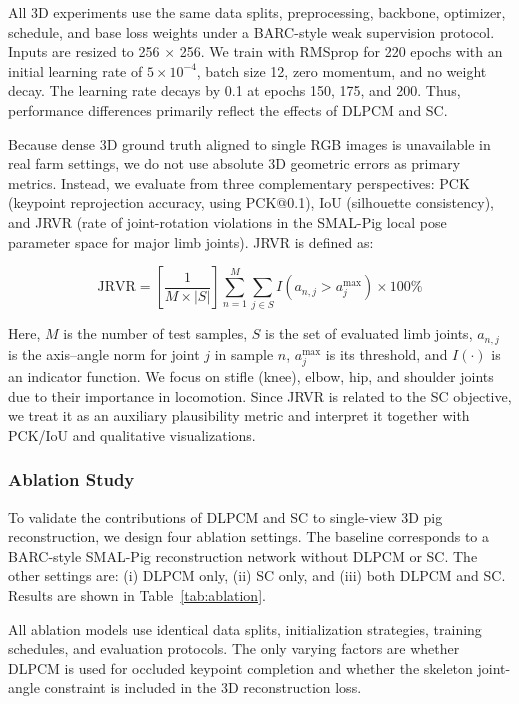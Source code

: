 \documentclass[computers,article,submit,pdftex,moreauthors]{Definitions/mdpi}
\begin{document}
All 3D experiments use the same data splits, preprocessing, backbone, optimizer, schedule, and base loss weights under a BARC-style weak supervision protocol. Inputs are resized to 256 $\times$ 256. We train with RMSprop for 220 epochs with an initial learning rate of $5 \times 10^{-4}$, batch size 12, zero momentum, and no weight decay. The learning rate decays by 0.1 at epochs 150, 175, and 200. Thus, performance differences primarily reflect the effects of DLPCM and SC.

Because dense 3D ground truth aligned to single RGB images is unavailable in real farm settings, we do not use absolute 3D geometric errors as primary metrics. Instead, we evaluate from three complementary perspectives: PCK (keypoint reprojection accuracy, using PCK@0.1), IoU (silhouette consistency), and JRVR (rate of joint-rotation violations in the SMAL-Pig local pose parameter space for major limb joints). JRVR is defined as:

\begin{equation}
\text{JRVR} = \left[\frac{1}{M \times |S|}\right] \sum_{n=1}^{M} \sum_{j \in S} I(a_{n,j} > a_j^{\max}) \times 100\%
\end{equation}

Here, $M$ is the number of test samples, $S$ is the set of evaluated limb joints, $a_{n,j}$ is the axis--angle norm for joint $j$ in sample $n$, $a_j^{\max}$ is its threshold, and $I(\cdot)$ is an indicator function. We focus on stifle (knee), elbow, hip, and shoulder joints due to their importance in locomotion. Since JRVR is related to the SC objective, we treat it as an auxiliary plausibility metric and interpret it together with PCK/IoU and qualitative visualizations.

\subsubsection{Ablation Study}\label{sec:ablation}

To validate the contributions of DLPCM and SC to single-view 3D pig reconstruction, we design four ablation settings. The baseline corresponds to a BARC-style SMAL-Pig reconstruction network without DLPCM or SC. The other settings are: (i) DLPCM only, (ii) SC only, and (iii) both DLPCM and SC. Results are shown in Table~\ref{tab:ablation}.

All ablation models use identical data splits, initialization strategies, training schedules, and evaluation protocols. The only varying factors are whether DLPCM is used for occluded keypoint completion and whether the skeleton joint-angle constraint is included in the 3D reconstruction loss.
\end{document}
